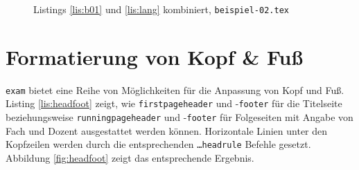 \begin{figure}[b]
\caption{Listings \ref{lis:b01} und \ref{lis:lang} kombiniert, \texttt{beispiel-02.tex}}\label{fig:b02}
\end{figure}

\section{Formatierung von Kopf \& Fuß}

\texttt{exam} bietet eine Reihe von Möglichkeiten für die Anpassung von Kopf und Fuß. 
Listing \ref{lis:headfoot} zeigt, wie \texttt{firstpageheader} und -\texttt{footer} für die Titelseite beziehungsweise \texttt{runningpageheader} und -\texttt{footer} für Folgeseiten mit Angabe von Fach und Dozent ausgestattet werden können.
Horizontale Linien unter den Kopfzeilen werden durch die entsprechenden \texttt{\dots headrule} Befehle gesetzt. 
Abbildung \ref{fig:headfoot} zeigt das entsprechende Ergebnis.


